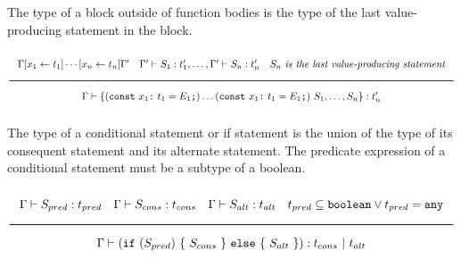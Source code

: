 The type of a block outside of function bodies is the type of the last value-producing statement in the block.

\noindent
\[
  \Rule{\Gamma [x_1 \leftarrow t_1] \cdots [x_n \leftarrow t_n] \Gamma' \quad
    \Gamma' \vdash S_1 : t'_1, \ldots, \Gamma' \vdash S_n : t'_n \quad S_n\ \textit{is the last value-producing statement}}{
    \Gamma \vdash \{ (\texttt{const}\ x_1 \texttt{:}\ t_1 = E_1\texttt{;}) \ldots (\texttt{const}\ x_1 \texttt{:}\ t_1 = E_1\texttt{;})\
    S_1, \ldots, S_n\} : t'_n}
\]
\noindent

The type of a conditional statement or if statement is the union of the type of its consequent statement and its alternate statement.
The predicate expression of a conditional statement must be a subtype of a boolean.

\noindent
\[
  \Rule{\Gamma \vdash S_{pred} : t_{pred} \quad \Gamma \vdash S_{cons} : t_{cons} \quad \Gamma \vdash S_{alt} : t_{alt}
    \quad t_{pred} \subseteq \Bool \vee t_{pred} = \Any}{\Gamma \vdash (\texttt{if}\ (S_{pred})\ \{\ S_{cons}\ \}\
    \texttt{else}\ \{\ S_{alt}\ \}) : t_{cons}\ |\ t_{alt}}
\]
\noindent
